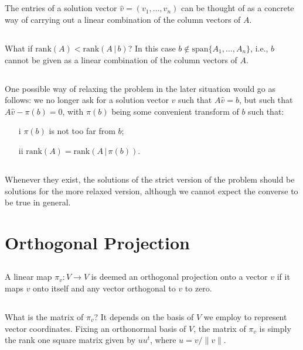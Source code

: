 \documentclass{proc-l}
\theoremstyle{definition}
\theoremstyle{remark}
\numberwithin{equation}{section}
\newcommand{\rank}[1]{\textrm{rank}({#1})}
\begin{document}
\subsection{}
The entries of a solution vector $\hat{v} = (v_1, \ldots, v_n)$ can be thought of as a concrete way of carrying out a linear combination of the column vectors of $A$.

\subsection{}
What if $\rank{A} < \rank{A\,|\,b}$? In this case $b\notin\textrm{span}\{A_1,\ldots,A_n\}$, i.e., $b$ cannot be given as a linear combination of the column vectors of $A$.

\subsection{}\label{transform}
One possible way of relaxing the problem in the later situation would go as follows: we no longer ask for a solution vector $\hat v$ such that $A\hat v = b$, but such that $A\hat v - \pi(b) = 0$, with $\pi(b)$ being some convenient transform of $b$ such that: 
\begin{itemize}
\item[i] $\pi(b)$ is not too far from $b$;
\item[ii] $\rank{A} = \rank{A\,|\,\pi(b)}$.
\end{itemize}

\subsection{}
Whenever they exist, the solutions of the strict version of the problem should be solutions for the more relaxed version, although we cannot expect the converse to be true in general.

\section{Orthogonal Projection}

\subsection{}
A linear map $\pi_v: V\to V$ is deemed an orthogonal projection onto a vector $v$ if it maps $v$ onto itself and any vector orthogonal to $v$ to zero.

\subsection{}
What is the matrix of $\pi_v$? It depends on the basis of $V$ we employ to represent vector coordinates. Fixing an orthonormal basis of $V$, the matrix of $\pi_v$ is simply the rank one square matrix given by $u u^t$, where $u=v/\|v\|$.
\end{document}
